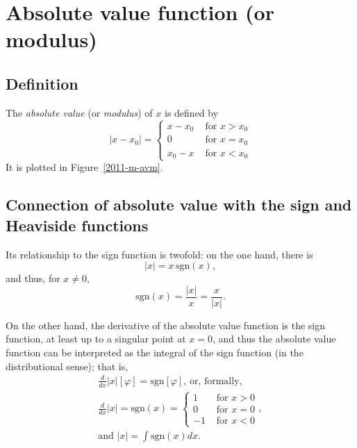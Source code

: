\section{Absolute value function (or modulus)}

\subsection{Definition}
The {\em absolute value} (or {\em modulus})
of $x$ is defined by
\begin{equation}
\left|
x-x_0\right|
=
\left\{
\begin{array}{ll}
x-x_0&\textrm{ for } x > x_0\\
0&\textrm{ for } x = x_0\\
x_0-x&\textrm{ for } x < x_0
\end{array}
\right.
\label{2011-m-di-avm}
\end{equation}
It is plotted in Figure~\ref{2011-m-avm}.


\subsection{Connection of absolute value with the sign and Heaviside functions}

Its relationship to the sign function is twofold:
on the one hand, there is
 \begin{equation}
 \left|x\right| = x \,\textrm{sgn} (x),
 \end{equation}
and thus, for $x\neq 0$,
 \begin{equation}
\textrm{sgn} (x)  = \frac{\left|x\right|}{x} = \frac{x}{\left|x\right|}.
 \end{equation}

On the other hand, the derivative of the absolute value function is the sign function, at least up to a singular point at $x=0$,
and thus the absolute value function can be interpreted as the integral of the sign function (in the distributional sense);
that is,
\begin{equation}
\begin{split}
\frac{d}{dx} \left|x\right| \left[ \varphi \right]
=
\textrm{sgn}\left[ \varphi \right] \text{, or, formally,}
\\
\frac{d }{dx} \left|x\right|
=
\textrm{sgn} (x)
=
\left\{
\begin{array}{rl}
1&\textrm{ for } x > 0\\
0&\textrm{ for } x = 0\\
-1&\textrm{ for } x < 0
\end{array}
\right.
,\\
\text{and } \left|x\right| =  \int \textrm{sgn} (x) dx.
\end{split}
 \end{equation}

